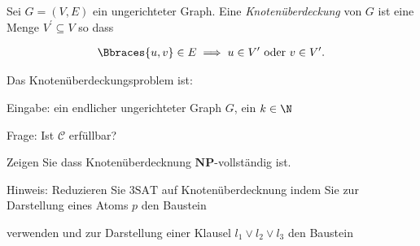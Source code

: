 
\begin{exercise}

Sei $G = (V, E)$ ein ungerichteter Graph.
Eine \textit{Knotenüberdeckung} von $G$ ist eine Menge $V^\prime \subseteq V$ so dass

\begin{align*}
    \Bbraces{u, v} \in E
    \implies
    u \in V^\prime ~\text{oder}~ v \in V^\prime.
\end{align*}

Das Knotenüberdeckungsproblem ist:

\begin{center}
    \begin{hetzlbox}[title = Knotenüberdeckung]
    
        Eingabe:
        ein endlicher ungerichteter Graph $G$, ein $k \in \N$
        
        Frage:
        Ist $\mathcal C$ erfüllbar?
    
    \end{hetzlbox}    
\end{center}

Zeigen Sie dass Knotenüberdecknung $\mathbf{NP}$-vollständig ist.

\begin{itshape}
    Hinweis:
    Reduzieren Sie $\mathrm{3SAT}$ auf Knotenüberdecknung indem Sie zur Darstellung eines Atoms $p$ den Baustein

    \begin{center}
    \end{center}

    verwenden und zur Darstellung einer Klausel $l_1 \lor l_2 \lor l_3$ den Baustein

    \begin{center}
    \end{center}

\end{itshape}

\end{exercise}

